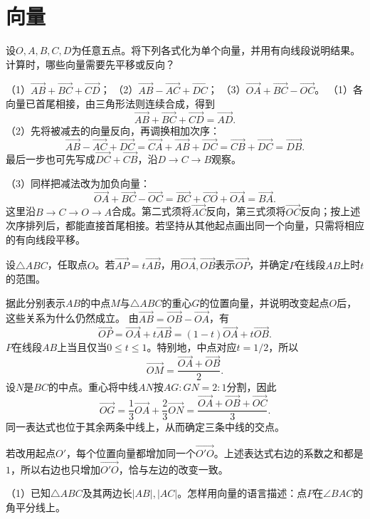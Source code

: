 \par\addvspace{12pt}

\section{向量}

\label{sol:sec:vector:1}

设\(O,A,B,C,D\)为任意五点。将下列各式化为单个向量，并用有向线段说明结果。计算时，哪些向量需要先平移或反向？

（1）\(\vec{AB}+\vec{BC}+\vec{CD}\)；\quad
（2）\(\vec{AB}-\vec{AC}+\vec{DC}\)；\quad
（3）\(\vec{OA}+\vec{BC}-\vec{OC}\)。
\solutionanswer
（1）各向量已首尾相接，由三角形法则连续合成，得到
\[
\vec{AB}+\vec{BC}+\vec{CD}=\vec{AD}.
\]
（2）先将被减去的向量反向，再调换相加次序：
\[
\vec{AB}-\vec{AC}+\vec{DC}
=\vec{CA}+\vec{AB}+\vec{DC}
=\vec{CB}+\vec{DC}=\vec{DB}.
\]
最后一步也可先写成\(\vec{DC}+\vec{CB}\)，沿\(D\to C\to B\)观察。

（3）同样把减法改为加负向量：
\[
\vec{OA}+\vec{BC}-\vec{OC}
=\vec{BC}+\vec{CO}+\vec{OA}
=\vec{BA}.
\]
这里沿\(B\to C\to O\to A\)合成。第二式须将\(\vec{AC}\)反向，第三式须将\(\vec{OC}\)反向；按上述次序排列后，都能直接首尾相接。若坚持从其他起点画出同一个向量，只需将相应的有向线段平移。


设\(\triangle ABC\)，任取点\(O\)。若\(\vec{AP}=t\vec{AB}\)，用\(\vec{OA},\vec{OB}\)表示\(\vec{OP}\)，并确定\(P\)在线段\(AB\)上时\(t\)的范围。

据此分别表示\(AB\)的中点\(M\)与\(\triangle ABC\)的重心\(G\)的位置向量，并说明改变起点\(O\)后，这些关系为什么仍然成立。
\solutionanswer
由\(\vec{AB}=\vec{OB}-\vec{OA}\)，有
\[
\vec{OP}=\vec{OA}+t\vec{AB}
=(1-t)\vec{OA}+t\vec{OB}.
\]
\(P\)在线段\(AB\)上当且仅当\(0\le t\le1\)。特别地，中点对应\(t=1/2\)，所以
\[
\vec{OM}=\frac{\vec{OA}+\vec{OB}}2.
\]
设\(N\)是\(BC\)的中点。重心将中线\(AN\)按\(AG:GN=2:1\)分割，因此
\[
\vec{OG}=\frac13\vec{OA}+\frac23\vec{ON}
=\frac{\vec{OA}+\vec{OB}+\vec{OC}}3.
\]
同一表达式也位于其余两条中线上，从而确定三条中线的交点。

若改用起点\(O'\)，每个位置向量都增加同一个\(\vec{O'O}\)。上述表达式右边的系数之和都是\(1\)，所以右边也只增加\(\vec{O'O}\)，恰与左边的改变一致。


（1）已知\(\triangle ABC\)及其两边长\(|AB|,|AC|\)。怎样用向量的语言描述：点\(P\)在\(\angle BAC\)的角平分线上。

